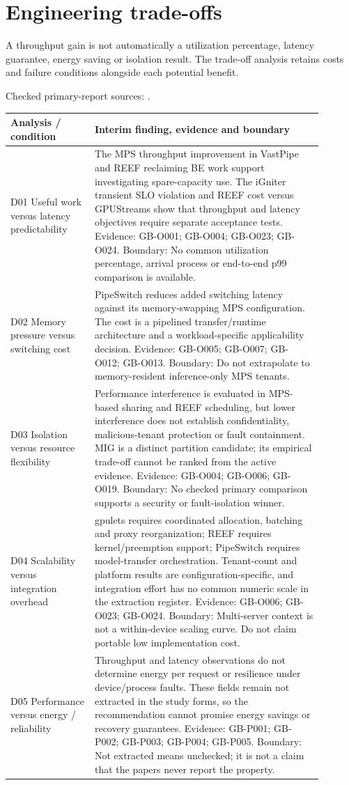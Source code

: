 \documentclass[12pt,a4paper]{article}
\begin{document}
\section{Engineering trade-offs}
A throughput gain is not automatically a utilization percentage, latency guarantee, energy saving or isolation result. The trade-off analysis retains costs and failure conditions alongside each potential benefit.


Checked primary-report sources: \cite{vastpipe,igniter,gpulets,pipeswitch,reef}. 
\begin{longtable}{p{0.24\linewidth}p{0.65\linewidth}}
\toprule
Analysis /\allowbreak{} condition & Interim finding, evidence and boundary\\\midrule
\endhead
D01 Useful work versus latency predictability & The MPS throughput improvement in VastPipe and REEF reclaiming BE work support investigating spare-capacity use. The iGniter transient SLO violation and REEF cost versus GPUStreams show that throughput and latency objectives require separate acceptance tests. Evidence: GB-O001; GB-O004; GB-O023; GB-O024. Boundary: No common utilization percentage, arrival process or end-to-end p99 comparison is available.\\
D02 Memory pressure versus switching cost & PipeSwitch reduces added switching latency against its memory-swapping MPS configuration. The cost is a pipelined transfer/\allowbreak{}runtime architecture and a workload-specific applicability decision. Evidence: GB-O005; GB-O007; GB-O012; GB-O013. Boundary: Do not extrapolate to memory-resident inference-only MPS tenants.\\
D03 Isolation versus resource flexibility & Performance interference is evaluated in MPS-based sharing and REEF scheduling, but lower interference does not establish confidentiality, malicious-tenant protection or fault containment. MIG is a distinct partition candidate; its empirical trade-off cannot be ranked from the active evidence. Evidence: GB-O004; GB-O006; GB-O019. Boundary: No checked primary comparison supports a security or fault-isolation winner.\\
D04 Scalability versus integration overhead & gpulets requires coordinated allocation, batching and proxy reorganization; REEF requires kernel/\allowbreak{}preemption support; PipeSwitch requires model-transfer orchestration. Tenant-count and platform results are configuration-specific, and integration effort has no common numeric scale in the extraction register. Evidence: GB-O006; GB-O023; GB-O024. Boundary: Multi-server context is not a within-device scaling curve. Do not claim portable low implementation cost.\\
D05 Performance versus energy /\allowbreak{} reliability & Throughput and latency observations do not determine energy per request or resilience under device/\allowbreak{}process faults. These fields remain not extracted in the study forms, so the recommendation cannot promise energy savings or recovery guarantees. Evidence: GB-P001; GB-P002; GB-P003; GB-P004; GB-P005. Boundary: Not extracted means unchecked; it is not a claim that the papers never report the property.\\
\bottomrule
\end{longtable}
\end{document}
